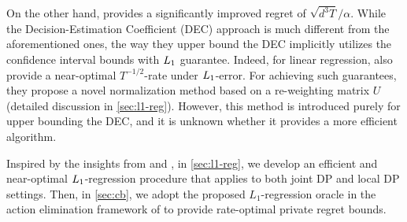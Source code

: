 On the other hand, \citet{chen2024private} provides a significantly improved regret of $\sqrt{d^3T}/\alpha$. While the Decision-Estimation Coefficient (DEC) approach is much different from the aforementioned ones, the way they upper bound the DEC implicitly utilizes the confidence interval bounds with $L_1$ guarantee. Indeed, for linear regression, \citet{chen2024private} also provide a near-optimal $T^{-1/2}$-rate under $L_1$-error. For achieving such guarantees, they propose a novel normalization method based on a re-weighting matrix $U$ (detailed discussion in \cref{sec:l1-reg}). However, this method is introduced purely for upper bounding the DEC, and it is unknown whether it provides a more efficient algorithm.

Inspired by the insights from \citet{li2024optimal} and \citet{chen2024private}, in \cref{sec:l1-reg}, we develop an efficient and near-optimal $L_1$-regression procedure that applies to both joint DP and local DP settings.
Then, in \cref{sec:cb}, we adopt the proposed $L_1$-regression oracle in the action elimination framework of \citet{li2024optimal} to provide rate-optimal private regret bounds.








